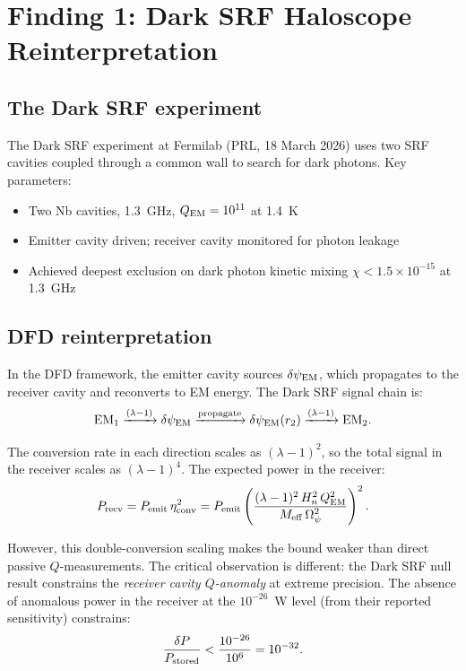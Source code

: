 \documentclass[11pt]{article}
\newcommand{\lam}{\lambda}
\newcommand{\Opsi}{\Omega_\psi}
\newcommand{\Meff}{M_{\rm eff}}
\newcommand{\ee}[1]{\times 10^{#1}}
\newcommand{\QEM}{Q_{\rm EM}}
\newcommand{\Heff}{H_n}
\newcommand{\dpsiEM}{\delta\psi_{\rm EM}}
\theoremstyle{definition}
\theoremstyle{remark}
\begin{document}
\section{Finding 1: Dark SRF Haloscope Reinterpretation}
\label{sec:dark_srf}

\subsection{The Dark SRF experiment}

The Dark SRF experiment at Fermilab (PRL, 18 March 2026) uses two
SRF cavities coupled through a common wall to search for dark photons.
Key parameters:
\begin{itemize}[nosep]
\item Two Nb cavities, 1.3~GHz, $\QEM = 10^{11}$ at 1.4~K
\item Emitter cavity driven; receiver cavity monitored for photon leakage
\item Achieved deepest exclusion on dark photon kinetic mixing
  $\chi < 1.5\ee{-15}$ at 1.3~GHz
\end{itemize}

\subsection{DFD reinterpretation}

In the DFD framework, the emitter cavity sources $\dpsiEM$, which
propagates to the receiver cavity and reconverts to EM energy. The
Dark SRF signal chain is:
\begin{equation}
\text{EM}_1 \xrightarrow{(\lam-1)} \dpsiEM
\xrightarrow{\text{propagate}} \dpsiEM(r_2)
\xrightarrow{(\lam-1)} \text{EM}_2.
\label{eq:dark_srf_chain}
\end{equation}

The conversion rate in each direction scales as $(\lam-1)^2$, so the
total signal in the receiver scales as $(\lam-1)^4$. The expected
power in the receiver:
\begin{equation}
P_{\rm recv} = P_{\rm emit}\,\eta_{\rm conv}^2
= P_{\rm emit}\left(\frac{(\lam-1)^2\,\Heff^2\,\QEM^2}
{\Meff\,\Opsi^2}\right)^2.
\label{eq:P_recv}
\end{equation}

However, this double-conversion scaling makes the bound weaker than
direct passive $Q$-measurements. The critical observation is different:
the Dark SRF null result constrains the \emph{receiver cavity $Q$-anomaly}
at extreme precision. The absence of anomalous power in the receiver
at the $10^{-26}$~W level (from their reported sensitivity) constrains:
\begin{equation}
\frac{\delta P}{P_{\rm stored}} < \frac{10^{-26}}{10^6}
= 10^{-32}.
\end{equation}
\end{document}
